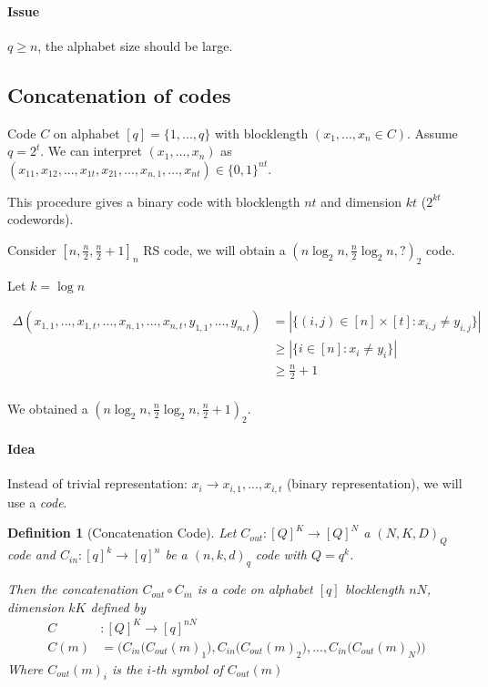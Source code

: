\documentclass{article}
\newtheorem{defi}{Definition}
\begin{document}
\paragraph{Issue}$q\geq n$, the alphabet size should be large.


\subsection{Concatenation of codes}

Code $C$ on alphabet $[q]=\{1,...,q\}$ with blocklength $(x_1,...,x_n \in C)$. Assume $q=2^t$. We can interpret $(x_1,...,x_n)$ as $(x_{11},x_{12},...,x_{1t},x_{21},...,x_{n,1},...,x_{nt})\in \{0,1\}^{nt}$.

This procedure gives a binary code with blocklength $nt$ and dimension $kt$ ($2^{kt}$ codewords).

Consider $\left[ n,\frac{n}{2},\frac{n}{2}+1 \right]_n$ RS code, we will obtain a $\left( n \log_2 n, \frac{n}{2}\log_2 n, ? \right)_2$ code.

\bigskip
Let $k=\log n$

\begin{align*}
\Delta(x_{1,1},...,x_{1,t},...,x_{n,1},...,x_{n,t},y_{1,1},...,y_{n,t}) & = |\{(i,j)\in [n]\times[t]:x_{i,j} \neq y_{i,j} \}|\\
& \geq |\{i\in [n]: x_i \neq y_i \}|\\
& \geq \frac{n}{2}+1 \tag{Distance of our original code}\\
\end{align*}


We obtained a $\left( n \log_2 n, \frac{n}{2}\log_2 n, \frac{n}{2} + 1 \right)_2$.


\paragraph{Idea}
Instead of trivial representation: $x_i\to x_{i,1},...,x_{i,t}$ (binary representation), we will use a \emph{code}.


\begin{defi}[Concatenation Code]
Let $C_{out} : [Q]^K\to [Q]^N$ a $(N,K,D)_Q$ code and $C_{in}: [q]^k \to [q]^n$ be a $(n,k,d)_q$ code with $Q=q^k$.

Then the concatenation $C_{out} \circ C_{in}$ is a code on alphabet $[q]$ blocklength $nN$, dimension $kK$ defined by
\begin{align*}
C &: [Q]^K\to [q]^{nN}\\
C(m) & = \Big( C_{in}\big(C_{out}(m)_1\big),C_{in}\big(C_{out}(m)_2\big),...,C_{in}\big(C_{out}(m)_N\big) \Big)
\end{align*}
Where $C_{out}(m)_i$ is the $i$-th symbol of $C_{out}(m)$

\end{defi}
\end{document}
